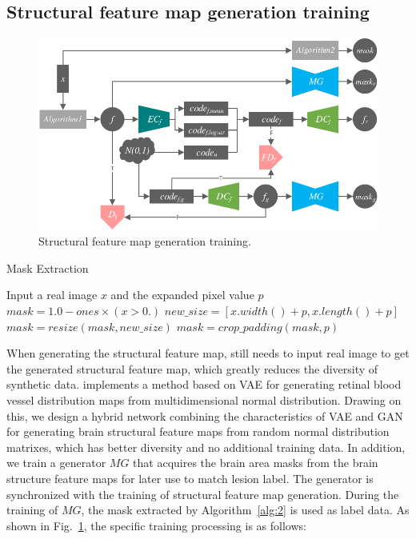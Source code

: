 \documentclass{ecai}
\begin{document}
\subsection{Structural feature map generation training}
\begin{figure}
	\centering
	\includegraphics[width=0.95\columnwidth]{figures/feature_train}
	\caption{Structural feature map generation training.}
	\label{feature_train}
\end{figure}
\begin{algorithm}
	\caption{Mask Extraction}
	\label{alg:2}
	\begin{algorithmic}[1]
		\State Input a real image $x$ and the expanded pixel value $p$
		\State $mask = 1.0 - ones \times (x > 0.)$
		\State $new\_size=[x.width() + p, x.length() + p]$
		\State $mask = resize(mask, new\_size)$
		\State $mask = crop\_padding(mask,p)$
	\end{algorithmic}  
\end{algorithm}
When generating the structural feature map, \cite{4shin2018medical} still needs to input real image to get the generated structural feature map, which greatly reduces the diversity of synthetic data. \cite{41costa2017towards} implements a method based on VAE for generating retinal blood vessel distribution maps from multidimensional normal distribution. Drawing on this, we design a hybrid network combining the characteristics of VAE and GAN for generating brain structural feature maps from random normal distribution matrixes, which has better diversity and no additional training data. In addition, we train a generator $MG$ that acquires the brain area masks from the brain structure feature maps for later use to match lesion label. The generator is synchronized with the training of structural feature map generation. During the training of $MG$, the mask extracted by Algorithm~\ref{alg:2} is used as label data. As shown in Fig.~\ref{feature_train}, the specific training processing is as follows:
\end{document}
